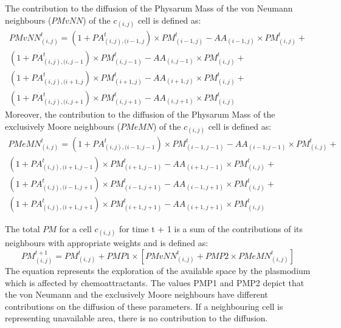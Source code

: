 \par
The contribution to the diffusion of the Physarum Mass of the von Neumann neighbours ($PMvNN$) of the $c_{(i,j)}$ cell is defined as:
\begin{equation}
\begin{split}
PMvNN^t_{(i, j)} = 
(1 + PA^t_{(i, j),(i-1, j}) \times PM^t_{(i-1, j)} - AA_{(i-1, j)} \times PM^t_{(i, j)} +
\\(1 + PA^t_{(i, j),(i, j-1}) \times PM^t_{(i, j-1)} - AA_{(i, j-1)} \times PM^t_{(i, j)} +
\\(1 + PA^t_{(i, j),(i+1, j}) \times PM^t_{(i+1, j)} - AA_{(i+1, j)} \times PM^t_{(i, j)}  +
\\(1 + PA^t_{(i, j),(i, j+1}) \times PM^t_{(i, j+1)} - AA_{(i, j+1)} \times PM^t_{(i, j)}
\end{split}
\end{equation}
Moreover, the contribution to the diffusion of the Physarum Mass of the exclusively Moore neighbours ($PMeMN$) of the $c_{(i,j)}$ cell is defined as:
\begin{equation}
\begin{split}
PMeMN^t_{(i, j)} = 
(1 + PA^t_{(i, j),(i-1, j-1}) \times PM^t_{(i-1, j-1)} - AA_{(i-1, j-1)} \times PM^t_{(i, j)} +
\\(1 + PA^t_{(i, j),(i+1, j-1}) \times PM^t_{(i+1, j-1)} - AA_{(i+1, j-1)} \times PM^t_{(i, j)} +
\\(1 + PA^t_{(i, j),(i-1, j+1}) \times PM^t_{(i-1, j+1)} - AA_{(i-1, j+1)} \times PM^t_{(i, j)}  +
\\(1 + PA^t_{(i, j),(i+1, j+1}) \times PM^t_{(i+1, j+1)} - AA_{(i+1, j+1)} \times PM^t_{(i, j)}
\end{split}
\end{equation}

The total $PM$ for a cell $c_{(i,j)}$ for time t + 1 is a sum of the contributions of its neighbours with appropriate weights and is defined as:
\begin{equation}
PM^{t+1}_{(i, j)} = PM^t_{(i, j)} + PMP1 \times [PMvNN^t_{(i, j)} + PMP2 \times PMeMN^t_{(i, j)}]
\end{equation}
The equation represents the exploration of the available space by the plasmodium which is affected by chemoattractants. The values PMP1 and PMP2 depict that the von Neumann and the exclusively Moore neighbours have different contributions on the diffusion of these parameters. If a neighbouring cell is representing unavailable area, there is no contribution to the diffusion.
 
